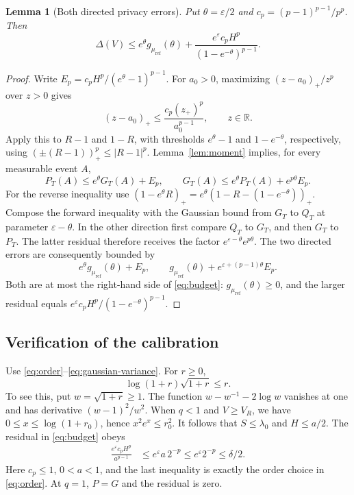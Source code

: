 \documentclass[11pt]{article}
\newtheorem{lemma}[theorem]{Lemma}
\newcommand{\R}{\mathbb R}
\begin{document}
\begin{lemma}[Both directed privacy errors]\label{lem:directions}
Put $\theta=\varepsilon/2$ and $c_p=(p-1)^{p-1}/p^p$. Then
\begin{equation}\label{eq:budget}
 \Delta(V)\le e^\theta g_{\mu_{\mathrm{ref}}}(\theta)
       +\frac{e^\varepsilon c_pH^p}{(1-e^{-\theta})^{p-1}}.
\end{equation}
\end{lemma}
\begin{proof}
Write $E_p=c_pH^p/(e^\theta-1)^{p-1}$.
For $a_0>0$, maximizing $(z-a_0)_+/z^p$ over $z>0$ gives
\[
 (z-a_0)_+\le\frac{c_p(z_+)^p}{a_0^{p-1}},\qquad z\in\R.
\]
Apply this to $R-1$ and $1-R$, with thresholds $e^\theta-1$ and
$1-e^{-\theta}$, respectively, using $(\pm(R-1))_+^p\le|R-1|^p$.
Lemma~\ref{lem:moment} implies, for every measurable event $A$,
\[
 P_T(A)\le e^\theta G_T(A)+E_p,\qquad
 G_T(A)\le e^\theta P_T(A)+e^{p\theta}E_p.
\]
For the reverse inequality use
$(1-e^\theta R)_+=e^\theta(1-R-(1-e^{-\theta}))_+$.
Compose the forward inequality with the Gaussian bound from $G_T$ to
$Q_T$ at parameter $\varepsilon-\theta$. In the other direction first
compare $Q_T$ to $G_T$, and then $G_T$ to $P_T$. The latter residual
therefore receives the factor $e^{\varepsilon-\theta}e^{p\theta}$.
The two directed errors are consequently bounded by
\[
 e^\theta g_{\mu_{\mathrm{ref}}}(\theta)+E_p,\qquad
 g_{\mu_{\mathrm{ref}}}(\theta)+e^{\varepsilon+(p-1)\theta}E_p.
\]
Both are at most the right-hand side of \eqref{eq:budget}: $g_{\mu_{\mathrm{ref}}}(\theta)\ge0$, and the larger
residual equals $e^\varepsilon c_pH^p/(1-e^{-\theta})^{p-1}$.
\end{proof}

\subsection{Verification of the calibration}
Use \eqref{eq:order}--\eqref{eq:gaussian-variance}. For $r\ge0$,
\begin{equation}\label{eq:log-inequality}
 \log(1+r)\sqrt{1+r}\le r.
\end{equation}
To see this, put $w=\sqrt{1+r}\ge1$. The function
$w-w^{-1}-2\log w$ vanishes at one and has derivative $(w-1)^2/w^2$.
When $q<1$ and $V\ge V_R$, we have $0\le x\le\log(1+r_0)$, hence
$x^2e^x\le r_0^2$. It follows that $S\le\lambda_0$ and $H\le a/2$.
The residual in \eqref{eq:budget} obeys
\begin{align*}
 \frac{e^\varepsilon c_pH^p}{a^{p-1}}
 &\le e^\varepsilon a\,2^{-p}
 \le e^\varepsilon2^{-p}\le\delta/2.
\end{align*}
Here $c_p\le1$, $0<a<1$, and the last inequality is exactly the order
choice in \eqref{eq:order}. At $q=1$, $P=G$ and the residual is zero.
\end{document}
